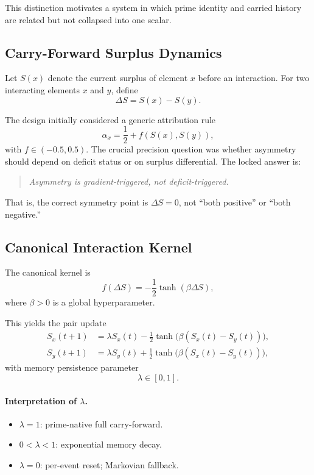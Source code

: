 \documentclass[11pt]{article}
\begin{document}
This distinction motivates a system in which prime identity and carried history are related but not collapsed into one scalar.

\subsection{Carry-Forward Surplus Dynamics}

Let \(S(x)\) denote the current surplus of element \(x\) before an interaction. For two interacting elements \(x\) and \(y\), define
\[
\Delta S = S(x)-S(y).
\]

The design initially considered a generic attribution rule
\[
\alpha_x = \frac{1}{2} + f(S(x),S(y)),
\]
with \(f\in(-0.5,0.5)\). The crucial precision question was whether asymmetry should depend on deficit status or on surplus differential. The locked answer is:

\begin{quote}
\emph{Asymmetry is gradient-triggered, not deficit-triggered.}
\end{quote}

That is, the correct symmetry point is \(\Delta S=0\), not ``both positive'' or ``both negative.''

\subsection{Canonical Interaction Kernel}

The canonical kernel is
\[
f(\Delta S) = -\frac{1}{2}\tanh(\beta \Delta S),
\]
where \(\beta>0\) is a global hyperparameter.

This yields the pair update
\begin{align}
S_x(t+1) &= \lambda S_x(t) - \frac{1}{2}\tanh\!\bigl(\beta (S_x(t)-S_y(t))\bigr), \\
S_y(t+1) &= \lambda S_y(t) + \frac{1}{2}\tanh\!\bigl(\beta (S_x(t)-S_y(t))\bigr),
\end{align}
with memory persistence parameter
\[
\lambda \in [0,1].
\]

\paragraph{Interpretation of \(\lambda\).}
\begin{itemize}[leftmargin=2em]
  \item \(\lambda=1\): prime-native full carry-forward.
  \item \(0<\lambda<1\): exponential memory decay.
  \item \(\lambda=0\): per-event reset; Markovian fallback.
\end{itemize}
\end{document}
